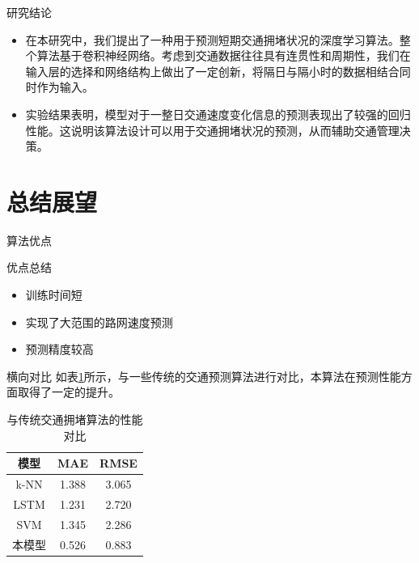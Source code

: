 \documentclass[10pt]{beamer}
\begin{document}
\begin{frame}{研究结论}
    \begin{itemize}
        \item 在本研究中，我们提出了一种用于预测短期交通拥堵状况的深度学习算法。整个算法基于卷积神经网络。考虑到交通数据往往具有连贯性和周期性，我们在输入层的选择和网络结构上做出了一定创新，将隔日与隔小时的数据相结合同时作为输入。
        \item 实验结果表明，模型对于一整日交通速度变化信息的预测表现出了\alert{较强的回归性能}。这说明该算法设计可以用于交通拥堵状况的预测，从而辅助交通管理决策。
    \end{itemize}
\end{frame}

\section{总结展望}
\begin{frame}{算法优点}
    \begin{block}{优点总结}
       \begin{itemize}
            \item 训练时间短
            \item 实现了大范围的路网速度预测
            \item 预测精度较高
        \end{itemize} 
    \end{block}
    
    \begin{block}{横向对比}
       如表\ref{tab.comparison}所示，与一些传统的交通预测算法进行对比，本算法在预测性能方面取得了一定的提升。
       \begin{table}[h!]
           \centering
           \begin{tabular}{|c|c|c|}
               \hline
               模型 & MAE & RMSE \\
               \hline
               k-NN & 1.388 & 3.065 \\
               \hline
               LSTM & 1.231 & 2.720 \\
               \hline
               SVM & 1.345 & 2.286 \\
               \hline
               本模型 & 0.526 & 0.883 \\
               \hline
           \end{tabular}
           \caption{与传统交通拥堵算法的性能对比}
           \label{tab.comparison}
       \end{table}
    \end{block}
\end{frame}
\end{document}
